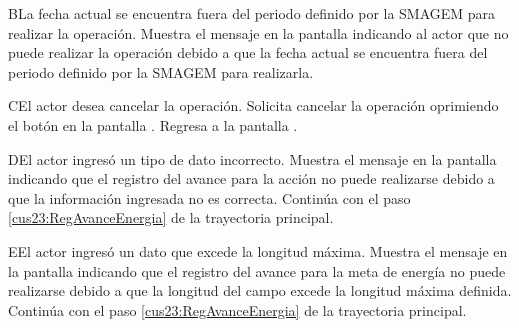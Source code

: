  \begin{UCtrayectoriaA}{B}{La fecha actual se encuentra fuera del periodo definido por la SMAGEM para realizar la operación.}
    \UCpaso[\UCsist] Muestra el mensaje  en la pantalla  indicando al actor que no puede realizar la operación debido a que la fecha actual se encuentra fuera del periodo definido por la SMAGEM para realizarla. 
 \end{UCtrayectoriaA}
    
     \begin{UCtrayectoriaA}{C}{El actor desea cancelar la operación.}
      \UCpaso[\UCactor] Solicita cancelar la operación oprimiendo el botón  en la pantalla .
      \UCpaso[] Regresa a la pantalla . 
    \end{UCtrayectoriaA}
    
    \begin{UCtrayectoriaA}{D}{El actor ingresó un tipo de dato incorrecto.}    
	\UCpaso[\UCsist] Muestra el mensaje  en la pantalla  indicando que el registro del avance para la acción no puede realizarse debido a que la información ingresada no es correcta.
	\UCpaso[] Continúa con el paso \ref{cus23:RegAvanceEnergia} de la trayectoria principal.     
    \end{UCtrayectoriaA}
    
    \begin{UCtrayectoriaA}{E}{El actor ingresó un dato que excede la longitud máxima.}    
	\UCpaso[\UCsist] Muestra el mensaje  en la pantalla  indicando que el registro del avance para la meta de energía no puede realizarse debido a que la longitud del campo excede la longitud máxima definida.
	\UCpaso[] Continúa con el paso \ref{cus23:RegAvanceEnergia} de la trayectoria principal.     
    \end{UCtrayectoriaA}
 
